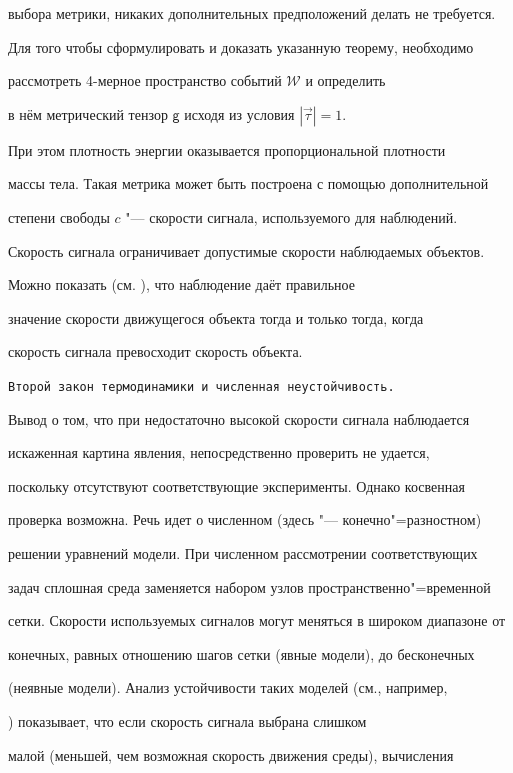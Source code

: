 выбора метрики, никаких дополнительных предположений делать не требуется.

Для того чтобы сформулировать и доказать указанную теорему, необходимо

рассмотреть 4-мерное пространство событий $\mathcal{W}$ и определить

в нём метрический тензор $\mathsf{g}$ исходя из условия \mbox{$|\vec{\tau}|=1$.}

При этом плотность энергии оказывается пропорциональной плотности

массы тела. Такая метрика может быть построена с помощью дополнительной

степени свободы $c$ "---  скорости сигнала, используемого для наблюдений.

Скорость сигнала ограничивает допустимые скорости наблюдаемых объектов.

Можно показать (см. \cite{Belevich03}), что наблюдение даёт правильное

значение скорости движущегося объекта тогда и только тогда, когда

скорость сигнала превосходит скорость объекта.



\smallskip



{\tt Второй закон термодинамики и численная неустойчивость.}

Вывод о том, что при недостаточно высокой скорости сигнала наблюдается

искаженная картина явления, непосредственно проверить не удается,

поскольку отсутствуют соответствующие эксперименты. Однако косвенная

проверка возможна. Речь идет о численном (здесь "---  конечно"=разностном)

решении уравнений модели. При численном рассмотрении соответствующих

задач сплошная среда заменяется набором узлов пространственно"=временной

сетки. Скорости используемых сигналов могут меняться в широком диапазоне от

конечных, равных отношению шагов сетки (явные модели), до бесконечных

(неявные модели). Анализ устойчивости таких моделей (см., например,

\cite{Roach}) показывает, что если скорость сигнала выбрана слишком

малой (меньшей, чем возможная скорость движения среды), вычисления

